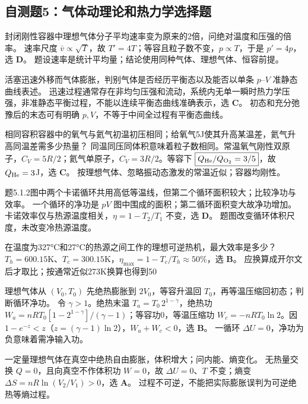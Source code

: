 \subsection{自测题5：气体动理论和热力学选择题}

\problemtext 封闭刚性容器中理想气体分子平均速率变为原来的2倍，问绝对温度和压强的倍率。
\workings 速率尺度 $\bar v\propto\sqrt T$，故 $T'=4T$；等容且粒子数不变，$p\propto T$，于是 $p'=4p$，选 \textbf{D}。
\crosscheck 题设速率是统计平均量；结论使用同种气体、理想气体、恒容前提。

\problemtext 活塞迅速外移而气体膨胀，判别气体是否经历平衡态以及能否以单条 $p$--$V$ 准静态曲线表述。
\workings 迅速过程通常存在非均匀压强和流动，系统内无单一瞬时热力学压强，非准静态平衡过程，不能以连续平衡态曲线准确表示，选 \textbf{C}。
\crosscheck 初态和充分弛豫后的末态可有明确 $p,V$，不等于中间全过程有平衡态曲线。

\problemtext 相同容积容器中的氧气与氦气初温初压相同；给氧气5J使其升高某温差，氦气升高同温差需多少热量？
\workings 同温同压同体积意味着粒子数相同。常温氧气刚性双原子，$C_V=5R/2$；氦气单原子，$C_V=3R/2$。等容下 $\boxed{Q_{\rm He}/Q_{\rm O_2}=3/5}$，故 $Q_{\rm He}=3$J，选 \textbf{C}。
\crosscheck 按理想气体、忽略振动态激发的常温近似；容器均刚性。

\problemtext 题5.1.2图中两个卡诺循环共用高低等温线，但第二个循环面积较大；比较净功与效率。
\workings 一个循环的净功是 $pV$ 图中围成的面积；第二循环面积变大故净功增加。卡诺效率仅与热源温度相关，$\eta=1-T_2/T_1$ 不变，选 \textbf{D}。
\crosscheck 题图改变循环体积尺度，未改变冷热源温度。

\problemtext 在温度为327°C和27°C的热源之间工作的理想可逆热机，最大效率是多少？
\workings $T_h=600.15$K、$T_c=300.15$K，$\eta_{\max}=1-T_c/T_h\approx\boxed{50\%}$，选 \textbf{B}。
\crosscheck 应换算成开尔文后才取比；按通常近似273K换算也得到50%

\problemtext 理想气体从 $(V_0,T_0)$ 先绝热膨胀到 $2V_0$，等容升温回 $T_0$，再等温压缩回初态；判断循环净功。
\workings 令 $\gamma>1$。绝热末温 $T_a=T_0\,2^{1-\gamma}$，绝热功 $W_a=nRT_0[1-2^{1-\gamma}]/(\gamma-1)$；等容功0，等温压缩功 $W_c=-nRT_0\ln2$。因 $1-e^{-z}<z$（$z=(\gamma-1)\ln2$），$W_a+W_c<0$，选 \textbf{B}。
\crosscheck 一循环 $\Delta U=0$，净功为负意味着需净输入功。

\problemtext 一定量理想气体在真空中绝热自由膨胀，体积增大；问内能、熵变化。
\workings 无热量交换 $Q=0$，且向真空不作体积功 $W=0$，故 $\Delta U=0$、$T$ 不变；熵变 $\Delta S=nR\ln(V_2/V_1)>0$，选 \textbf{A}。
\crosscheck 过程不可逆，不能把实际膨胀误判为可逆绝热等熵过程。

